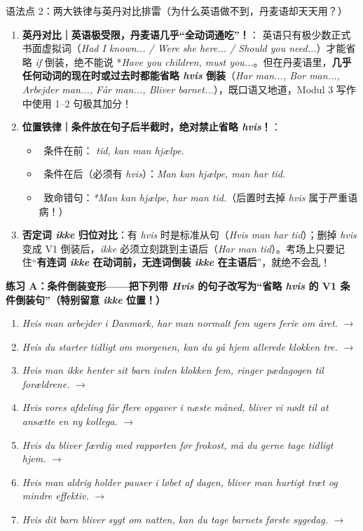 \begin{grammatikbox}{语法点 2：两大铁律与英丹对比排雷（为什么英语做不到，丹麦语却天天用？）}
\begin{enumerate}
  \item \textbf{英丹对比｜英语极受限，丹麦语几乎“全动词通吃”！}：
    英语只有极少数正式书面虚拟词（\textit{Had I known... / Were she here... / Should you need...}）才能省略 \textit{if} 倒装，绝不能说 *\textit{Have you children, must you...}。但在丹麦语里，\textbf{几乎任何动词的现在时或过去时都能省略 \textit{hvis} 倒装}（\textit{Har man..., Bor man..., Arbejder man..., Får man..., Bliver barnet...}），既口语又地道，Modul 3 写作中使用 1--2 句极其加分！
  \item \textbf{位置铁律｜条件放在句子后半截时，绝对禁止省略 \textit{hvis}！}：
    \begin{itemize}
      \item {}\ 条件在前：\textit{ tid, kan man hjælpe.}
      \item {}\ 条件在后（必须有 \textit{hvis}）：\textit{Man kan hjælpe,  man har tid.}
      \item {}\ 致命错句：\textit{*Man kan hjælpe, har man tid.}（后置时去掉 \textit{hvis} 属于严重语病！）
    \end{itemize}
  \item \textbf{否定词 \textit{ikke} 归位对比}：有 \textit{hvis} 时是标准从句（\textit{Hvis man  har tid}）；删掉 \textit{hvis} 变成 V1 倒装后，\textit{ikke} 必须立刻跳到主语后（\textit{Har man  tid}）。考场上只要记住“\textbf{有连词 \textit{ikke} 在动词前，无连词倒装 \textit{ikke} 在主语后}”，就绝不会乱！
\end{enumerate}
\end{grammatikbox}


\textbf{练习 A：条件倒装变形——把下列带 \textit{Hvis} 的句子改写为“省略 \textit{hvis} 的 V1 条件倒装句”（特别留意 \textit{ikke} 位置！）}
\begin{enumerate}
  \item \textit{Hvis man arbejder i Danmark, har man normalt fem ugers ferie om året.} $\rightarrow$
  \item \textit{Hvis du starter tidligt om morgenen, kan du gå hjem allerede klokken tre.} $\rightarrow$
  \item \textit{Hvis man ikke henter sit barn inden klokken fem, ringer pædagogen til forældrene.} $\rightarrow$
  \item \textit{Hvis vores afdeling får flere opgaver i næste måned, bliver vi nødt til at ansætte en ny kollega.} $\rightarrow$
  \item \textit{Hvis du bliver færdig med rapporten før frokost, må du gerne tage tidligt hjem.} $\rightarrow$
  \item \textit{Hvis man aldrig holder pauser i løbet af dagen, bliver man hurtigt træt og mindre effektiv.} $\rightarrow$
  \item \textit{Hvis dit barn bliver sygt om natten, kan du tage barnets første sygedag.} $\rightarrow$
\end{enumerate}

